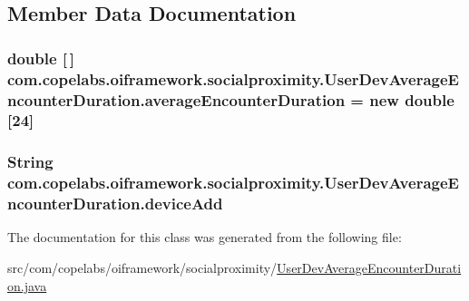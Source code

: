 \subsection{Member Data Documentation}
\hypertarget{classcom_1_1copelabs_1_1oiframework_1_1socialproximity_1_1_user_dev_average_encounter_duration_a6b7d9c697cc33d33e715f0080eba888d}{}
\subsubsection[{average\+Encounter\+Duration}]{\setlength{\rightskip}{0pt plus 5cm}double \mbox{[}$\,$\mbox{]} com.\+copelabs.\+oiframework.\+socialproximity.\+User\+Dev\+Average\+Encounter\+Duration.\+average\+Encounter\+Duration = new double \mbox{[}24\mbox{]}\hspace{0.3cm}{\ttfamily [private]}}\label{classcom_1_1copelabs_1_1oiframework_1_1socialproximity_1_1_user_dev_average_encounter_duration_a6b7d9c697cc33d33e715f0080eba888d}
\hypertarget{classcom_1_1copelabs_1_1oiframework_1_1socialproximity_1_1_user_dev_average_encounter_duration_a583f42fad660e870f57d79cf2271032e}{}
\subsubsection[{device\+Add}]{\setlength{\rightskip}{0pt plus 5cm}String com.\+copelabs.\+oiframework.\+socialproximity.\+User\+Dev\+Average\+Encounter\+Duration.\+device\+Add\hspace{0.3cm}{\ttfamily [private]}}\label{classcom_1_1copelabs_1_1oiframework_1_1socialproximity_1_1_user_dev_average_encounter_duration_a583f42fad660e870f57d79cf2271032e}


The documentation for this class was generated from the following file\+:\begin{DoxyCompactItemize}
\item 
src/com/copelabs/oiframework/socialproximity/\hyperlink{_user_dev_average_encounter_duration_8java}{User\+Dev\+Average\+Encounter\+Duration.\+java}\end{DoxyCompactItemize}
